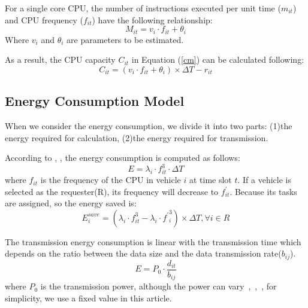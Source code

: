 \documentclass[conference]{IEEEtran}
\begin{document}
	For a single core CPU, the number of instructions executed per unit time ($m_{it}$) and CPU frequency ($f_{it}$) have the following relationship:
	\begin{equation}
		M_{it} = v_i \cdot f_{it} + \theta_i
		\label{mf}
	\end{equation}
	Where $v_ {i} $ and $\theta_ i$ are parameters to be estimated. 
	
	As a result, the CPU capacity $C_{it}$ in Equation (\ref{cm}) can be calculated following:
	\begin{equation}
		C_{it} = (v_i \cdot f_{it} + \theta_i)   \times \Delta T 
		- r_{it}
		\label{cf}
	\end{equation}
	
	\subsection{Energy Consumption Model}
	When we consider the energy consumption, we divide it into two parts: (1)the energy required for calculation, (2)the energy required for transmission. 
	
	According to \cite{efv}, \cite{vf}%
	, the energy consumption is computed as follows:
	\begin{equation}
		E=\lambda_{i} \cdot f_{it}^{3} \cdot \Delta T
		\label{ef}
	\end{equation}
	where $f_ {it}$ is the frequency of the CPU in vehicle $i$ at time slot $t$. If a vehicle is selected as the requester(R), its frequency will decrease to $f^ \prime _ {it}$. Because its tasks are assigned, so the energy saved  is:
	\begin{equation}
		E_{i}^{save}
		=( \lambda_{i} \cdot f_{it}^{3} -
		\lambda_{i} \cdot{f^{\prime}}_{i}^{3} ) \times \Delta T
		, 
		\forall i \in R
	\end{equation}
	
	The transmission energy consumption is linear with the transmission time which depends on the ratio between the data size and the data transmission rate($b_{ij}$). 
	\begin{equation}
		E = P_0 \cdot \frac{d_{it}}{b_{ij}}
	\end{equation} 
	where $P_0$ is the transmission power, although the power can vary~\cite{liu2021primal},~\cite{liu2022approximation},~\cite{dai2022note}, for simplicity, we use a fixed value in this article. 
	
\end{document}

